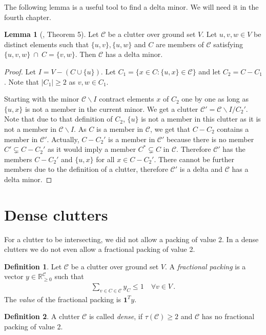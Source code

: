 \documentclass[a4paper, 12pt, twoside=false]{scrbook}
\theoremstyle{definition}
\newtheorem*{definition}{Definition}
\newtheorem{lemma}[theorem]{Lemma}
\newcommand*{\IR}{\ensuremath{\mathbb{R}}}
\begin{document}
The following lemma is a useful tool to find a delta minor. We will need it in the fourth chapter.
\begin{lemma}[\cite{deltas}, Theorem 5]\label{finddelta}
    Let $\mathcal{C}$ be a clutter over ground set $V$. Let $u,v,w \in V$ be distinct elements such that $\{u,v\}, \{u,w\}$ and $C$ are members of $\mathcal{C}$ satisfying $\{u,v,w\}~\cap~C = \{v,w\}$. Then $\mathcal{C}$ has a delta minor.
\end{lemma}

\begin{proof}
    Let $I=V-(C \cup \{u\})$. Let $C_1 = \{x \in C: \{u,x\} \in \mathcal{C}\}$ and let $C_2=C-C_1$. Note that $|C_1|\geq 2$ as $v,w \in C_1$.

    Starting with the minor $\mathcal{C} \backslash I$ contract elements $x$ of $C_2$ one by one as long as $\{u,x\}$ is not a member in the current minor.
    We get a clutter $\mathcal{C'}=\mathcal{C} \backslash I/C_2'$.
    Note that due to that definition of $C_2$, $\{u\}$ is not a member in this clutter as it is not a member in $\mathcal{C} \backslash I$.
    As $C$ is a member in $\mathcal{C}$, we get that $C-C_2$ contains a member in $\mathcal{C'}$.
    Actually, $C-C_2'$ is a member in $\mathcal{C'}$ because there is no member $C' \subsetneq C-C_2'$ as it would imply a member $C^* \subsetneq C$ in $\mathcal{C}$.
    Therefore $\mathcal{C'}$ has the members $C-C_2'$ and $\{u,x\}$ for all $x \in C-C_2'$. There cannot be further members due to the definition of a clutter, therefore $\mathcal{C'}$ is a delta and $\mathcal{C}$ has a delta minor.
\end{proof}


\section{Dense clutters}
For a clutter to be intersecting, we did not allow a packing of value 2. In a dense clutters we do not even allow a fractional packing of value 2.
\begin{definition}
    Let $\mathcal{C}$ be a clutter over ground set $V$.
    A \emph{fractional packing} is a vector $y \in \IR_{\geq0}^{\mathcal{C}}$ such that
    \begin{align*}
        \sum_{v \in C \in \mathcal{C}} y_C \leq 1 \quad \forall v \in V \,.
    \end{align*}
    The \emph{value} of the fractional packing is $\textbf{1}^Ty$.
\end{definition}
\begin{definition}
    A clutter $\mathcal{C}$ is called \emph{dense}, if $\tau(\mathcal{C}) \geq 2$ and $\mathcal{C}$ has no fractional packing of value 2.
\end{definition}
\end{document}
